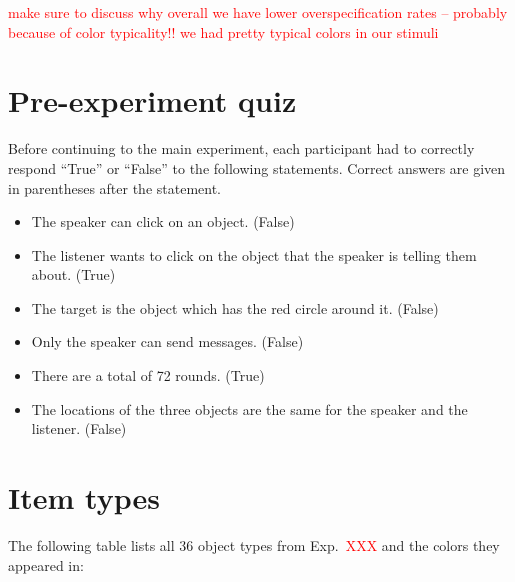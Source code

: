 \documentclass[11pt]{article}
\newcommand{\red}[1]{\textcolor{Red}{#1}}
\begin{document}
\red{make sure to discuss why overall we have lower overspecification rates -- probably because of color typicality!! we had pretty typical colors in our stimuli}

\section{Pre-experiment quiz}
\label{app:numdistractors}

Before continuing to the main experiment, each participant had to correctly respond ``True'' or ``False'' to the following statements. Correct answers are given in parentheses after the statement.

\begin{itemize}
	\item The speaker can click on an object. (False)
	\item The listener wants to click on the object that the speaker is
  telling them about. (True)
  \item  The target is the object which has the red circle around it. (False)
  \item Only the speaker can send messages. (False)
  \item There are a total of 72 rounds. (True)
  \item The locations of the three objects are the same for the speaker and the listener. (False)
\end{itemize}


\section{Item types}
\label{app:itemtypes}

The following table lists all 36 object types from Exp.~\red{XXX} and the colors they appeared in:
\end{document}
